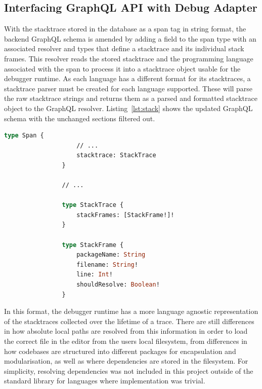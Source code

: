 \documentclass[12pt,pdftex,titlepage]{report}
\begin{document}
            \subsection{Interfacing GraphQL API with Debug Adapter}
                With the stacktrace stored in the database as a span tag in string format, the backend GraphQL schema is amended by adding a field to the span type with an associated resolver and 
                types that define a stacktrace and its individual stack frames. This resolver reads the stored stacktrace and the programming language associated with the span to process it into a 
                stacktrace object usable for the debugger runtime. As each language has a different format for its stacktraces, a stacktrace parser must be created for each language supported. These
                will parse the raw stacktrace strings and returns them as a parsed and formatted stacktrace object to the GraphQL resolver. Listing~\ref{lst:stack} shows the updated GraphQL schema
                with the unchanged sections filtered out. 

            \smallskip
            \begin{lstlisting}[caption={GraphQL schema updated with stack- trace and frame objects. Unchanged fields and objects filtered. The \texttt{shouldReslolve} field indicates
                whether a file path requires additional resolving in the debugger runtime.}, language=GraphQL, gobble=16, label={lst:stack}]
                type Span {
                    // ...
                    stacktrace: StackTrace
                }

                // ...

                type StackTrace {
                    stackFrames: [StackFrame!]!
                }

                type StackFrame {
                    packageName: String
                    filename: String!
                    line: Int!
                    shouldResolve: Boolean!
                }
            \end{lstlisting}
            \medskip

            In this format, the debugger runtime has a more language agnostic representation of the stacktraces collected over the lifetime of a trace. There are still differences
            in how absolute local paths are resolved from this information in order to load the correct file in the editor from the users local filesystem, from differences in how
            codebases are structured into different packages for encapsulation and modularisation, as well as where dependencies are stored in the filesystem. For simplicity, 
            resolving dependencies was not included in this project outside of the standard library for languages where implementation was trivial.
\end{document}
